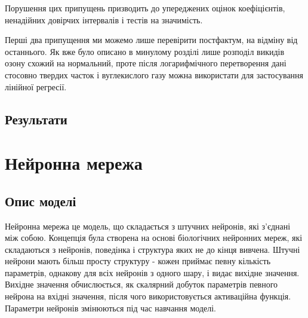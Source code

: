 Порушення цих припущень призводить до упереджених оцінок коефіцієнтів, ненадійних довірчих інтервалів і тестів на значимість.

Перші два припущення ми можемо лише перевірити постфактум, на відміну від останнього. 
Як вже було описано в минулому розділі лише розподіл викидів озону схожий на нормальний, проте після логарифмічного перетворення дані стосовно твердих часток і вуглекислого газу можна використати для застосування лінійної регресії.

\subsection{Результати}

\section{Нейронна мережа}

\subsection{Опис моделі}

Нейронна мережа це модель, що складається з штучних нейронів, які з'єднані між собою. 
Концепція була створена на основі біологічних нейронних мереж, які складаються з нейронів, поведінка і структура яких не до кінця вивчена. 
Штучні нейрони мають більш просту структуру - кожен приймає певну кількість параметрів, однакову для всіх нейронів з одного шару, і видає вихідне значення. 
Вихідне значення обчислюється, як скалярний добуток параметрів певного нейрона на вхідні значення, після чого використовується активаційна функція. 
Параметри нейронів змінюються під час навчання моделі. 

